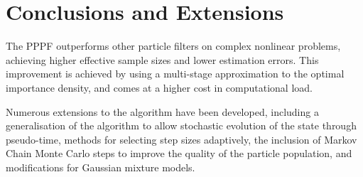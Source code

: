 \documentclass[conference]{IEEEtran}
\begin{document}
\section{Conclusions and Extensions}

The PPPF outperforms other particle filters on complex nonlinear problems, achieving higher effective sample sizes and lower estimation errors. This improvement is achieved by using a multi-stage approximation to the optimal importance density, and comes at a higher cost in computational load.

Numerous extensions to the algorithm have been developed, including a generalisation of the algorithm to allow stochastic evolution of the state through pseudo-time, methods for selecting step sizes adaptively, the inclusion of Markov Chain Monte Carlo steps to improve the quality of the particle population, and modifications for Gaussian mixture models.





\end{document}
